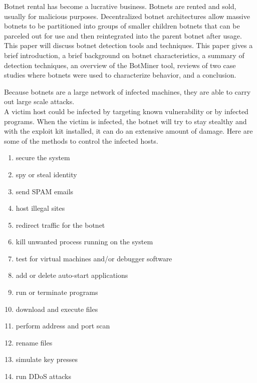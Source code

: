 Botnet rental has become a lucrative business. Botnets are rented and sold, usually for malicious purposes. Decentralized botnet architectures allow massive botnets to be partitioned into groups of smaller children botnets that can be parceled out for use and then reintegrated into the parent botnet after usage.
This paper will discuss botnet detection tools and techniques. This paper gives a brief introduction, a brief background on botnet characteristics, a summary of detection techniques, an overview of the BotMiner tool, reviews of two case studies where botnets were used to characterize behavior, and a conclusion.


Because botnets are a large network of infected machines, they are able to carry out large scale attacks.\\ 
A victim host could be infected by targeting known vulnerability or by infected programs. When the victim is infected, the botnet will try to stay stealthy and with the exploit kit installed, it can do an extensive amount of damage. Here are some of the methods to control the infected hosts.
\begin{enumerate}
\item secure the system
\item spy or steal identity
\item send SPAM emails
\item host illegal sites
\item redirect traffic for the botnet
\item kill unwanted process running on the system
\item test for virtual machines and/or debugger software
\item add or delete auto-start applications
\item run or terminate programs
\item download and execute files
\item perform address and port scan
\item rename files
\item simulate key presses
\item run DDoS attacks
\end{enumerate}

